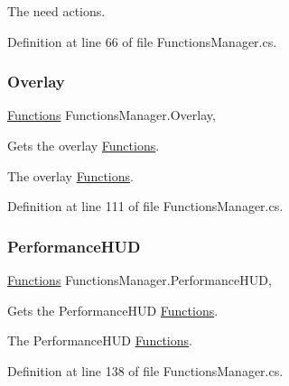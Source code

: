 The need actions.

Definition at line 66 of file Functions\+Manager.\+cs.

\mbox{\label{class_functions_manager_a99ef54ef4c8b8ad56633818c211732f0}} 
\subsubsection{\texorpdfstring{Overlay}{Overlay}}
{\footnotesize\ttfamily \hyperlink{class_functions}{Functions} Functions\+Manager.\+Overlay\hspace{0.3cm}{\ttfamily [static]}, {\ttfamily [get]}}



Gets the overlay \hyperlink{class_functions}{Functions}. 

The overlay \hyperlink{class_functions}{Functions}.

Definition at line 111 of file Functions\+Manager.\+cs.

\mbox{\label{class_functions_manager_af5866c74169758f0dc46f2040acf15cd}} 
\subsubsection{\texorpdfstring{Performance\+H\+UD}{PerformanceHUD}}
{\footnotesize\ttfamily \hyperlink{class_functions}{Functions} Functions\+Manager.\+Performance\+H\+UD\hspace{0.3cm}{\ttfamily [static]}, {\ttfamily [get]}}



Gets the Performance\+H\+UD \hyperlink{class_functions}{Functions}. 

The Performance\+H\+UD \hyperlink{class_functions}{Functions}.

Definition at line 138 of file Functions\+Manager.\+cs.

\mbox{\label{class_functions_manager_a1d8177de448c438576e8df9bf326768a}} 
